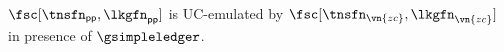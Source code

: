\begin{theorem}
  $\fsc[\tnsfn_{\mathsf{pp}}, \lkgfn_{\mathsf{pp}}]$ is UC-emulated by
  $\fsc[\tnsfn_\vn{zc}, \lkgfn_{\vn{zc}}]$ in presence of $\gsimpleledger$.
  \label{thm:zerocash}
\end{theorem}

